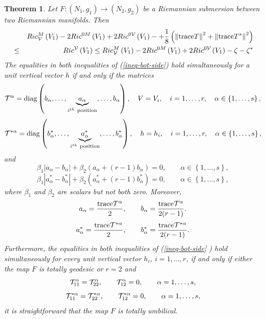 \documentclass[10pt,a4paper]{article}
\newtheorem{theorem}{Theorem}[section]
\theoremstyle{definition}
\theoremstyle{remark}
\numberwithin{equation}{section}
\begin{document}
\begin{theorem}
\label{Th-ineq-both-side-vert}Let $F:(N_{1},g_{1})\rightarrow (N_{2},g_{2})$
be a Riemannian submersion between two Riemannian manifolds. Then%
\begin{eqnarray}
&&Ric_{{\cal V}}^{M}\left( V_{1}\right) -2Ric^{0M}\left( V_{1}\right)
+2Ric^{0{\cal V}}\left( V_{1}\right) -+\frac{1}{8}\left( \left\Vert {\rm %
trace}T\right\Vert ^{2}+\left\Vert {\rm trace}T^{\ast }\right\Vert
^{2}\right)  \nonumber \\
&\leq &Ric^{{\cal V}}\left( V_{1}\right) \leq Ric_{{\cal V}}^{M}\left(
V_{1}\right) -2Ric^{0M}\left( V_{1}\right) +2Ric^{0{\cal V}}\left(
V_{1}\right) -\zeta -\zeta ^{\ast }  \label{ineq-bot-side}
\end{eqnarray}%
The equalities in both inequalities of {\rm (\ref{ineq-bot-side})} hold
simultaneously for a unit vertical vector $h$ if and only if the matrices 
\[
{\cal T}^{\alpha }={\rm diag}\left( b_{\alpha },\ldots ,\underset{i^{th}\ 
{\rm position}}{\underbrace{a_{\alpha }}},\ldots ,b_{\alpha }\right) ,\quad
V=V_{i},\quad i=1,\ldots ,r,\quad \alpha \in \left\{ 1,\ldots ,s\right\} , 
\]%
\[
{\cal T}^{\ast \alpha }={\rm diag}\left( b_{\alpha }^{\ast },\ldots ,%
\underset{i^{th}\ {\rm position}}{\underbrace{a_{\alpha }^{\ast }}},\ldots
,b_{\alpha }^{\ast }\right) ,\quad h=h_{i},\quad i=1,\ldots ,r,\quad \alpha
\in \left\{ 1,\ldots ,s\right\} , 
\]%
and 
\[
\beta _{1}|a_{\alpha }-b_{\alpha }|+\beta _{2}\left( a_{\alpha
}+(r-1)b_{\alpha }\right) =0,\qquad \alpha \in \left\{ 1,\ldots ,s\right\} , 
\]%
\[
\beta _{1}|a_{\alpha }^{\ast }-b_{\alpha }^{\ast }|+\beta _{2}\left(
a_{\alpha }^{\ast }+(r-1)b_{\alpha }^{\ast }\right) =0,\qquad \alpha \in
\left\{ 1,\ldots ,s\right\} , 
\]%
where $\beta _{1}$ and $\beta _{2}$ are scalars but not both zero. Moreover, 
\[
a_{\alpha }=\frac{{\rm trace}{\cal T}^{\alpha }}{2},\qquad b_{\alpha }=\frac{%
{\rm trace}{\cal T}^{\alpha }}{2(r-1)}. 
\]%
\[
a_{\alpha }^{\ast }=\frac{{\rm trace}{\cal T}^{\ast \alpha }}{2},\qquad
b_{\alpha }^{\ast }=\frac{{\rm trace}{\cal T}^{\ast \alpha }}{2(r-1)}. 
\]%
Furthermore, the equalities in both inequalities of {\rm (\ref{ineq-bot-side}%
)} hold simultaneously for every unit vertical vector $h_{i}$, $i=1,\ldots
,r $, if and only if either the map $F$ is totally geodesic or $r=2$ and 
\[
{\cal T}_{11}^{\alpha }={\cal T}_{22}^{\alpha },\qquad {\cal T}_{12}^{\alpha
}=0,\qquad \alpha =1,\ldots ,s, 
\]%
\[
{\cal T}_{11}^{\ast \alpha }={\cal T}_{22}^{\ast \alpha },\qquad {\cal T}%
_{12}^{\ast \alpha }=0,\qquad \alpha =1,\ldots ,s, 
\]%
it is straightforward that the map $F$ is totally umbilical.
\end{theorem}
\end{document}
